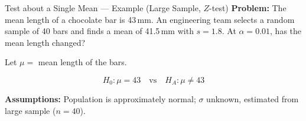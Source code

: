 \documentclass[12pt, aspectratio=169]{beamer}
\begin{document}
    \begin{frame}{Test about a Single Mean --- Example (Large Sample, $Z$-test)}
        \textbf{Problem:} The mean length of a chocolate bar is 43\,mm.
        An engineering team selects a random sample of 40 bars and finds a
        mean of 41.5\,mm with $s = 1.8$.
        At $\alpha = 0.01$, has the mean length changed?

        \vspace{0.8em}

        Let $\mu = $ mean length of the bars.

        \[
            H_0: \mu = 43 \quad \text{vs} \quad H_A: \mu \neq 43
        \]

        \vspace{0.5em}

        \textbf{Assumptions:} Population is approximately normal; $\sigma$ unknown,
        estimated from large sample ($n = 40$).
    \end{frame}
\end{document}
